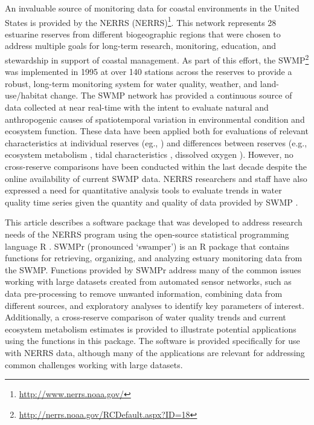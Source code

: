\documentclass[10pt,letterpaper]{article}\usepackage[]{graphicx}\usepackage[]{color}
\begin{document}
An invaluable source of monitoring data for coastal environments in the United States is provided by the \acl{NERRS} (\acs{NERRS})\footnote{\url{http://www.nerrs.noaa.gov/}}.  This network represents 28 estuarine reserves from different biogeographic regions that were chosen to address multiple goals for long-term research, monitoring, education, and stewardship in support of coastal management.  As part of this effort, the \acf{SWMP}\footnote{\url{http://nerrs.noaa.gov/RCDefault.aspx?ID=18}} was implemented in 1995 at over 140 stations across the reserves to provide a robust, long-term monitoring system for water quality, weather, and land-use/habitat change.  The \ac{SWMP} network has provided a continuous source of data collected at near real-time with the intent to evaluate natural and anthropogenic causes of spatiotemporal variation in environmental condition and ecosystem function.  These data have been applied both for evaluations of relevant characteristics at individual reserves (eg., \cite{Bulthius95,Dix08}) and differences between reserves (e.g., ecosystem metabolism \cite{Caffrey03,Caffrey04}, tidal characteristics \cite{Sanger02}, dissolved oxygen \cite{Wenner04}).  However, no cross-reserve comparisons have been conducted within the last decade despite the online availability of current \ac{SWMP} data.  \ac{NERRS} researchers and staff have also expressed a need for quantitative analysis tools to evaluate trends in water quality time series given the quantity and quality of data provided by \ac{SWMP} \cite{SWMP14}.          

This article describes a software package that was developed to address research needs of the \ac{NERRS} program using the open-source statistical programming language R \cite{RDCT14}.  SWMPr (pronounced `swamper') is an R package that contains functions for retrieving, organizing, and analyzing estuary monitoring data from the \acl{SWMP}.  Functions provided by SWMPr address many of the common issues working with large datasets created from automated sensor networks, such as data pre-processing to remove unwanted information, combining data from different sources, and exploratory analyses to identify key parameters of interest.  Additionally, a cross-reserve comparison of water quality trends and current ecosystem metabolism estimates is provided to illustrate potential applications using the functions in this package.  The software is provided specifically for use with \ac{NERRS} data, although many of the applications are relevant for addressing common challenges working with large datasets.
\end{document}
